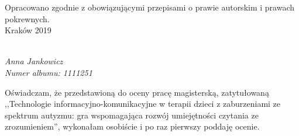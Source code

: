 \documentclass[a4paper,12pt]{report}
\newcommand{\authorname}{Anna Jankowicz}
\begin{document}
{\centering\small{Opracowano zgodnie z obowiązującymi przepisami o prawie autorskim i prawach pokrewnych.}\\ \vspace{0.25cm}\Large{Kraków 2019\\}}


\newpage
\setcounter{page}{1}
\thispagestyle{firststyle}
\vspace*{10cm}
\emph{\\\authorname\\ Numer albumu: 1111251\\}

Oświadczam, że przedstawioną do oceny pracę magisterską, zatytułowaną
,,Technologie informacyjno-komunikacyjne w terapii dzieci z zaburzeniami ze spektrum autyzmu: gra wspomagająca rozwój umiejętności czytania ze zrozumieniem'', wykonałam osobiście i po raz pierwszy poddaję ocenie.




\tableofcontents
\thispagestyle{firststyle}
 
\listoftables
\thispagestyle{firststyle}
\begingroup
\let\clearpage\relax
\listoffigures
\endgroup







\renewcommand{\bibsetup}{\thispagestyle{firststyle}}
{\linespread{1.25}\printbibliography[title=Bibliografia, heading=bibintoc]}
\end{document}
